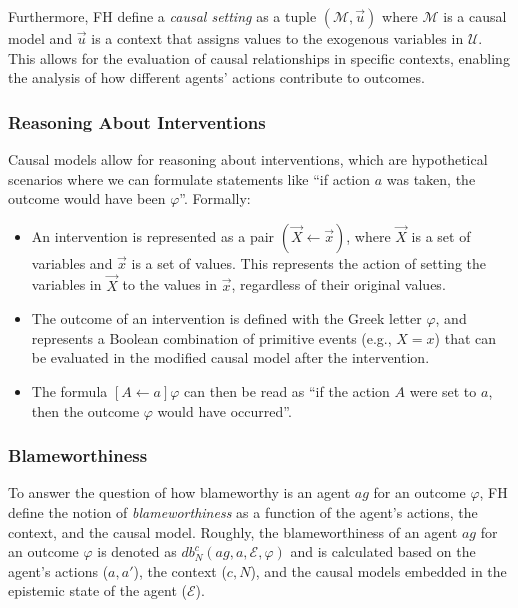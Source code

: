 \documentclass{article}
\begin{document}
Furthermore, FH define a \textit{causal setting} as a tuple $(\mathcal{M},\vec{u})$ where $\mathcal{M}$ is a causal model and $\vec{u}$ is a context that assigns values to the exogenous variables in $\mathcal{U}$. This allows for the evaluation of causal relationships in specific contexts, enabling the analysis of how different agents' actions contribute to outcomes.

\subsubsection{Reasoning About Interventions}

Causal models allow for reasoning about interventions, which are hypothetical scenarios where we can formulate statements like ``if action $a$ was taken, the outcome would have been $\varphi$''. Formally:

\begin{itemize}
  \item An intervention is represented as a pair $(\vec{X} \gets \vec{x})$, where $\vec{X}$ is a set of variables and $\vec{x}$ is a set of values. This represents the action of setting the variables in $\vec{X}$ to the values in $\vec{x}$, regardless of their original values.
  \item The outcome of an intervention is defined with the Greek letter $\varphi$, and represents a Boolean combination of primitive events (e.g., $X=x$) that can be evaluated in the modified causal model after the intervention.
  \item The formula $[A \gets a]\varphi$ can then be read as ``if the action $A$ were set to $a$, then the outcome $\varphi$ would have occurred''.
\end{itemize}


\subsubsection{Blameworthiness}

To answer the question of how blameworthy is an agent $ag$ for an outcome $\varphi$, FH define the notion of \textit{blameworthiness} as a function of the agent's actions, the context, and the causal model. Roughly, the blameworthiness of an agent $ag$ for an outcome $\varphi$ is denoted as $db^c_N(ag,a,\mathcal{E},\varphi)$ and is calculated based on the agent's actions ($a,a'$), the context ($c,N$), and the causal models embedded in the epistemic state of the agent ($\mathcal{E}$).
\end{document}
